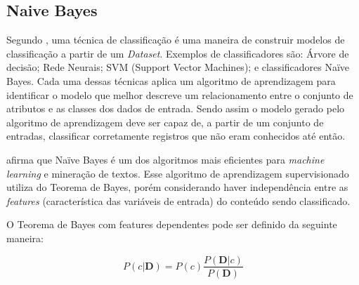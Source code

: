 \subsection{Naive Bayes}
Segundo , uma técnica de classificação é uma maneira de construir modelos de classificação a partir de um \textit{Dataset}. Exemplos de classificadores são: Árvore de decisão; Rede Neurais; SVM (Support Vector Machines); e classificadores Naïve Bayes.
Cada uma dessas técnicas aplica um algoritmo de aprendizagem para identificar o modelo que melhor descreve um relacionamento entre o conjunto de atributos e as classes dos dados de entrada. Sendo assim o modelo gerado pelo algoritmo de aprendizagem deve ser capaz de, a partir de um conjunto de entradas, classificar corretamente registros que não eram conhecidos até então.

 afirma que Naïve Bayes é um dos algoritmos mais eficientes para \textit{machine learning} e mineração de textos. Esse algoritmo de aprendizagem supervisionado utiliza do Teorema de Bayes, porém considerando haver independência entre as \textit{features} (característica das variáveis de entrada) do conteúdo sendo classificado.

O Teorema de Bayes com features dependentes pode ser definido da seguinte maneira:

\begin{equation}
\label{eq:bayes_classic}
P(c|\textbf{D}) = P(c ) \frac{P(\textbf{D} |c)}{P(\textbf{D})}
\end{equation}



